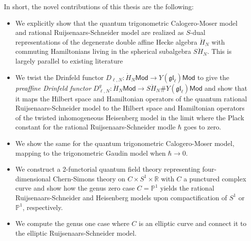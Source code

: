 \documentclass[11pt]{report}
\theoremstyle{definition}
\theoremstyle{remark}
\theoremstyle{remark}
\newcommand{\R}{\mathbb{R}}
\renewcommand{\P}{\mathbb{P}}
\begin{document}
In short, the novel contributions of this thesis are the following:
\begin{itemize}
\item We explicitly show that the quantum trigonometric Calogero-Moser model and rational Ruijsenaars-Schneider model are realized as $S$-dual representations of the degenerate double affine Hecke algebra $\ddot H_N$ with commuting Hamiltonians living in the spherical subalgebra $S\ddot H_N$. This is largely parallel to existing literature
\item We twist the Drinfeld functor $D_{\ell,N}: \dot H_N \mathsf{Mod} \to Y(\mathfrak{gl}_\ell) \mathsf{Mod}$ to give the \emph{preaffine Drinfeld functor} $D_{\ell,N}^g: \ddot H_N \mathsf{Mod} \to S\ddot H_N \# Y(\mathfrak{gl}_\ell) \mathsf{Mod}$ and show that it maps the Hilbert space and Hamiltonian operators of the quantum rational Ruijsenaars-Schneider model to the Hilbert space and Hamiltonian operators of the twisted inhomogeneous Heisenberg model in the limit where the Plack constant for the rational Ruijsenaars-Schneider modle $\hbar$ goes to zero.
\item We show the same for the quantum trigonometric Calogero-Moser model, mapping to the trigonometric Gaudin model when $\hbar \to 0$.
\item We construct a 2-functorial quantum field theory representing four-dimensional Chern-Simons theory on $C \times S^1 \times \R$ with $C$ a punctured complex curve and show how the genus zero case $C = \P^1$ yields the rational Ruijsenaars-Schneider and Heisenberg models upon compactification of $S^1$ or $\P^1$, respectively.
\item We compute the genus one case where $C$ is an elliptic curve and connect it to the elliptic Ruijsenaars-Schneider model.
\end{itemize}
\end{document}
